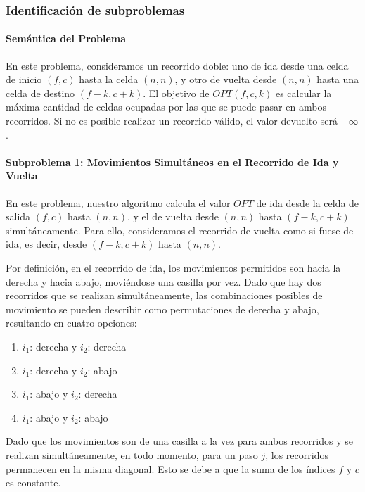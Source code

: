 \subsubsection{Identificación de subproblemas}

\paragraph{Semántica del Problema}
En este problema, consideramos un recorrido doble: uno de ida desde una celda 
de inicio $(f, c)$ hasta la celda $(n, n)$, y otro de vuelta desde $(n, n)$ 
hasta una celda de destino $(f - k, c + k)$. El objetivo de $OPT(f, c, k)$ 
es calcular la máxima cantidad de celdas ocupadas por las que se puede pasar 
en ambos recorridos. Si no es posible realizar un recorrido válido, 
el valor devuelto será $-\infty$.

\paragraph{Subproblema 1: Movimientos Simultáneos en el Recorrido de Ida y Vuelta}

En este problema, nuestro algoritmo calcula el valor $OPT$ de ida desde la celda de salida 
$(f, c)$ hasta $(n, n)$, y el de vuelta desde $(n, n)$ hasta $(f - k, c + k)$ simultáneamente. 
Para ello, consideramos el recorrido de vuelta como si fuese de ida, es decir, desde 
$(f - k, c + k)$ hasta $(n, n)$.

Por definición, en el recorrido de ida, los movimientos permitidos son hacia la derecha y 
hacia abajo, moviéndose una casilla por vez. Dado que hay dos recorridos que se realizan 
simultáneamente, las combinaciones posibles de movimiento se pueden describir como 
permutaciones de derecha y abajo, resultando en cuatro opciones:

\begin{enumerate}
    \item $i_1$: derecha y $i_2$: derecha
    \item $i_1$: derecha y $i_2$: abajo
    \item $i_1$: abajo y $i_2$: derecha
    \item $i_1$: abajo y $i_2$: abajo
\end{enumerate}

Dado que los movimientos son de una casilla a la vez para ambos recorridos y se realizan 
simultáneamente, en todo momento, para un paso $j$, los recorridos permanecen en la misma 
diagonal. Esto se debe a que la suma de los índices $f$ y $c$ es constante. 

